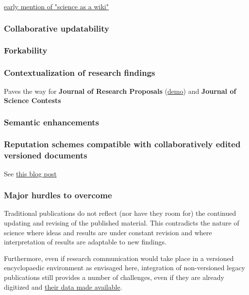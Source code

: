 \documentclass[final,authoryear,3p]{elsarticle-open-drafting}
\begin{document}
\href{http://opencontract.org/}{early mention of "science as a wiki"}

\subsubsection{Collaborative updatability}
\subsubsection{Forkability}
\subsubsection{Contextualization of research findings}
Paves the way for {\bf Journal of Research Proposals} (\href{http://iphylo.blogspot.com/2011/06/would-you-give-me-grant-experiment-in.html}{demo}) and {\bf Journal of Science Contests}

\subsubsection{Semantic enhancements}
\subsubsection{Reputation schemes compatible with collaboratively edited versioned documents}
See \href{http://www.science3point0.com/evomri/2011/04/16/citing-versioned-papers-robots-and-reviewers/}{this blog post}

\subsubsection{Major hurdles to overcome}
Traditional publications do not reflect (nor have they room for) the continued updating and revising of the published material. This contradicts the nature of science where ideas and results are under constant revision and where interpretation of results are adaptable to new findings. 

Furthermore, even if research communication would take place in a versioned encyclopaedic environment as envisaged here, integration of non-versioned legacy publications still provides a number of challenges, even if they are already digitized and \href{http://blog.datadryad.org/2011/02/22/archiving-legacy-data-or-why-is-dryad-better-than-a-floppy-disk/}{their data made available}.
\end{document}
